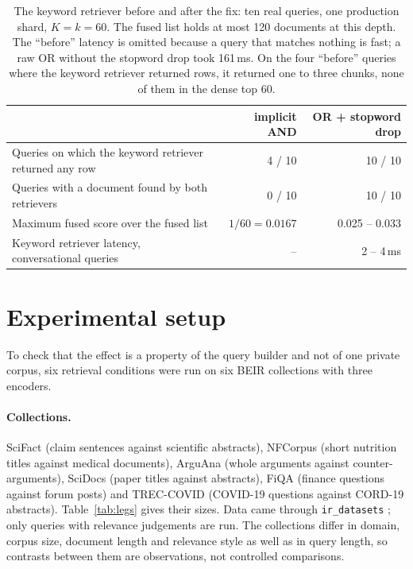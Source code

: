 \documentclass[11pt]{article}
\begin{document}
\begin{table}[h]
\centering
\small
\begin{tabular}{lrr}
\toprule
 & implicit AND & OR + stopword drop \\
\midrule
Queries on which the keyword retriever returned any row & 4 / 10 & 10 / 10 \\
Queries with a document found by both retrievers & 0 / 10 & 10 / 10 \\
Maximum fused score over the fused list & $1/60 = 0.0167$ & 0.025 -- 0.033 \\
Keyword retriever latency, conversational queries & -- & 2 -- 4\,ms \\
\bottomrule
\end{tabular}
\caption{The keyword retriever before and after the fix: ten real queries, one production shard, $K = k = 60$. The fused list holds at most 120 documents at this depth. The ``before'' latency is omitted because a query that matches nothing is fast; a raw OR without the stopword drop took 161\,ms. On the four ``before'' queries where the keyword retriever returned rows, it returned one to three chunks, none of them in the dense top 60.}
\label{tab:prod}
\end{table}

\section{Experimental setup}
\label{sec:setup}

To check that the effect is a property of the query builder and not of one private corpus, six retrieval conditions were run on six BEIR collections \citep{thakur2021beir} with three encoders.

\paragraph{Collections.} SciFact \citep{wadden2020scifact} (claim sentences against scientific abstracts), NFCorpus \citep{boteva2016nfcorpus} (short nutrition titles against medical documents), ArguAna \citep{wachsmuth2018arguana} (whole arguments against counter-arguments), SciDocs \citep{cohan2020specter} (paper titles against abstracts), FiQA \citep{maia2018fiqa} (finance questions against forum posts) and TREC-COVID \citep{voorhees2020treccovid} (COVID-19 questions against CORD-19 abstracts). Table~\ref{tab:legs} gives their sizes. Data came through \texttt{ir\_datasets} \citep{macavaney2021irdatasets}; only queries with relevance judgements are run. The collections differ in domain, corpus size, document length and relevance style as well as in query length, so contrasts between them are observations, not controlled comparisons.
\end{document}
